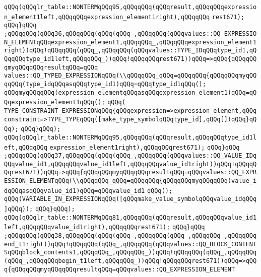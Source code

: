 \verb|qQQq(qQQqlr_table::NONTERMqQQq95,qQQqqQQq(qQQqresult,qQQqqQQqexpression_element1left,qQQqqQQqexpression_element1right),qQQqqQQq|\newline
\verb|rest671);|\newline
\verb|qQQq}qQQq|\newline
\verb|;qQQqqQQq(qQQq36,qQQqqQQq(qQQq(qQQq_,qQQqqQQq(qQQqvalues::QQ_EXPRESSION_ELEMENTqQQqexpression_element1,qQQqqQQq_,qQQqqQQqexpression_element1right))qQQq!qQQqqQQq(qQQq_,qQQqqQQq(qQQqvalues::TYPE_IDqQQqtype_id1,qQQqqQQqtype_id1left,qQQqqQQq_))qQQq!qQQqqQQqrest671))qQQq=>qQQq{qQQqqQQqmyqQQqqQQqresultqQQq=qQQq|\newline
\verb|values::QQ_TYPED_EXPRESSIONqQQq(\\qQQqqQQq_qQQq=qQQqqQQq{qQQqqQQqmyqQQqqQQq(type_idqQQqasqQQqtype_id1)qQQq=qQQqtype_id1qQQq();|\newline
\verb|qQQqmyqQQqqQQq(expression_elementqQQqasqQQqexpression_element1)qQQq=qQQqexpression_element1qQQq();|\newline
\verb|qQQq(|\newline
\verb|TYPE_CONSTRAINT_EXPRESSIONqQQq{qQQqexpression=>expression_element,qQQqconstraint=>TYPE_TYPEqQQq([make_type_symbolqQQqtype_id],qQQq[])qQQq}qQQq);|\newline
\verb|qQQq}qQQq);|\newline
\verb|qQQq(qQQqlr_table::NONTERMqQQq95,qQQqqQQq(qQQqresult,qQQqqQQqtype_id1left,qQQqqQQq|\newline
\verb|expression_element1right),qQQqqQQqrest671);|\newline
\verb|qQQq}qQQq|\newline
\verb|;qQQqqQQq(qQQq37,qQQqqQQq(qQQq(qQQq_,qQQqqQQq(qQQqvalues::QQ_VALUE_IDqQQqvalue_id1,qQQqqQQqvalue_id1left,qQQqqQQqvalue_id1right))qQQq!qQQqqQQqrest671))qQQq=>qQQq{qQQqqQQqmyqQQqqQQqresultqQQq=qQQqvalues::QQ_EXPRESSION_ELEMENTqQQq(\\qQQqqQQq_qQQq=qQQqqQQq{qQQqqQQqmyqQQqqQQq(value_idqQQqasqQQqvalue_id1)qQQq=qQQqvalue_id1|\newline
\verb|qQQq();|\newline
\verb|qQQq(VARIABLE_IN_EXPRESSIONqQQq([qQQqmake_value_symbolqQQqvalue_idqQQq]qQQq));|\newline
\verb|qQQq}qQQq);|\newline
\verb|qQQq(qQQqlr_table::NONTERMqQQq81,qQQqqQQq(qQQqresult,qQQqqQQqvalue_id1left,qQQqqQQqvalue_id1right),qQQqqQQqrest671);|\newline
\verb|qQQq}qQQq|\newline
\verb|;qQQqqQQq(qQQq38,qQQqqQQq(qQQq(qQQq_,qQQqqQQq(qQQq_,qQQqqQQq_,qQQqqQQqend_t1right))qQQq!qQQqqQQq(qQQq_,qQQqqQQq(qQQqvalues::QQ_BLOCK_CONTENTSqQQqblock_contents1,qQQqqQQq_,qQQqqQQq_))qQQq!qQQqqQQq(qQQq_,qQQqqQQq(qQQq_,qQQqqQQqbegin_t1left,qQQqqQQq_))qQQq!qQQqqQQqrest671))qQQq=>qQQq{qQQqqQQqmyqQQqqQQqresultqQQq=qQQqvalues::QQ_EXPRESSION_ELEMENT|\newline
